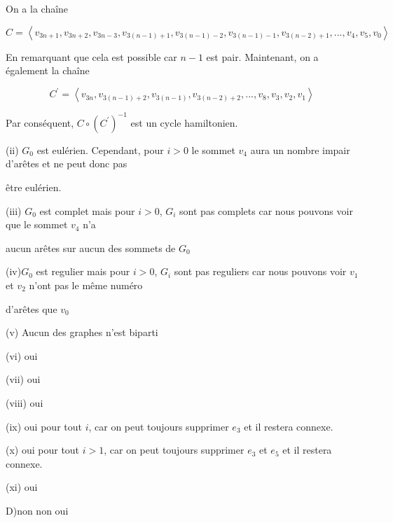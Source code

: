\documentclass{article}
\newcommand{\tuple}[1]{\ensuremath{\left\langle #1 \right\rangle}}
\begin{document}
On a la chaîne

$$C = \tuple{v_{3n + 1},v_{3n + 2},v_{3n - 3},v_{3(n-1) + 1},v_{3(n-1) - 2},v_{3(n-1) - 1},v_{3(n-2) + 1}, ... , v_4,v_5,v_0}$$

En remarquant que cela est possible car $n-1$ est pair. Maintenant, on a également la chaîne 

$$C^{\prime} = \tuple{v_{3n},v_{3(n-1) + 2},v_{3(n-1)},v_{3(n-2) + 2}, ...,v_8, v_3,v_2,v_1}$$

Par conséquent, $C \circ (C^{\prime})^{-1}$ est un cycle hamiltonien.



(ii) $G_0$ est eulérien. Cependant, pour $i>0$  le sommet $v_4$ aura un nombre impair d'arêtes et ne peut donc pas 

être eulérien.

(iii) $G_0$ est complet mais pour $i > 0$, $G_i$ sont pas complets car nous pouvons voir que le sommet $v_4$ n'a 

aucun arêtes sur aucun des sommets de $G_0$

(iv)$G_0$ est regulier mais pour $i > 0$, $G_i$ sont pas reguliers car nous pouvons voir $v_1$ et $v_2$  n'ont pas le même numéro 

d'arêtes que $v_0$

(v) Aucun des graphes n'est biparti

(vi) oui

(vii) oui

(viii) oui

(ix) oui pour tout $i$, car on peut toujours supprimer $e_3$ et il restera connexe.

(x) oui pour tout $i> 1$, car on peut toujours supprimer $e_3$ et $e_5$ et il restera connexe.

(xi) oui

D)non non oui


    
\end{document}
